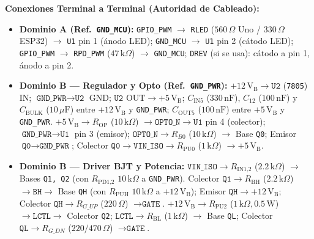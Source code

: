 \documentclass[10pt, a4paper, landscape]{article}
\begin{document}
\noindent
\begin{minipage}[t]{0.48\linewidth}
\sloppy
\textbf{Conexiones Terminal a Terminal (Autoridad de Cableado):}
\begin{itemize}[noitemsep, topsep=2pt]
    \item \textbf{Dominio A (Ref.\ \texttt{GND\_MCU}):} \texttt{GPIO\_PWM} $\rightarrow$ \texttt{RLED} ($560\,\Omega$ Uno / $330\,\Omega$ ESP32) $\rightarrow$ \texttt{U1} pin 1 (ánodo LED); \texttt{GND\_MCU} $\rightarrow$ \texttt{U1} pin 2 (cátodo LED); \texttt{GPIO\_PWM} $\rightarrow$ \texttt{RPD\_PWM} ($47\,\text{k}\Omega$) $\rightarrow$ \texttt{GND\_MCU}; \texttt{DREV} (si se usa): cátodo a pin 1, ánodo a pin 2.
    \item \textbf{Dominio B — Regulador y Opto (Ref.\ \texttt{GND\_PWR}):} $+12\,\text{V}_{\text{B}} \rightarrow \texttt{U2}$ (\texttt{7805}) IN; $\texttt{GND\_PWR} \rightarrow \texttt{U2}$ GND; $\texttt{U2}\text{ OUT} \rightarrow +5\,\text{V}_{\text{B}}$; $C_{\text{IN5}}$ ($330\,\text{nF}$), $C_{12}$ ($100\,\text{nF}$) y $C_{\text{BULK}}$ ($10\,\mu\text{F}$) entre $+12\,\text{V}_{\text{B}}$ y \texttt{GND\_PWR}; $C_{\text{OUT5}}$ ($100\,\text{nF}$) entre $+5\,\text{V}_{\text{B}}$ y \texttt{GND\_PWR}. $+5\,\text{V}_{\text{B}} \rightarrow R_{\text{OP}}$ ($10\,\text{k}\Omega$) $\rightarrow \texttt{OPTO\_N} \rightarrow \texttt{U1}$ pin 4 (colector); $\texttt{GND\_PWR} \rightarrow \texttt{U1}$ pin 3 (emisor); $\texttt{OPTO\_N} \rightarrow R_{B0}$ ($10\,\text{k}\Omega$) $\rightarrow$ Base \texttt{Q0}; Emisor $\texttt{Q0} \rightarrow \texttt{GND\_PWR}$; Colector $\texttt{Q0} \rightarrow \texttt{VIN\_ISO} \rightarrow R_{\text{PU0}}$ ($1\,\text{k}\Omega$) $\rightarrow +5\,\text{V}_{\text{B}}$.
    \item \textbf{Dominio B — Driver BJT y Potencia:} $\texttt{VIN\_ISO} \rightarrow R_{\text{IN1,2}}$ ($2.2\,\text{k}\Omega$) $\rightarrow$ Bases \texttt{Q1, Q2} (con $R_{\text{PD1,2}}$ $10\,\text{k}\Omega$ a \texttt{GND\_PWR}). Colector $\texttt{Q1} \rightarrow R_{\text{BH}}$ ($2.2\,\text{k}\Omega$) $\rightarrow \texttt{BH} \rightarrow$ Base \texttt{QH} (con $R_{\text{PUH}}$ $10\,\text{k}\Omega$ a $+12\,\text{V}_{\text{B}}$); Emisor $\texttt{QH} \rightarrow +12\,\text{V}_{\text{B}}$; Colector $\texttt{QH} \rightarrow R_{G\_UP}$ ($220\,\Omega$) $\rightarrow \texttt{GATE}$. $+12\,\text{V}_{\text{B}} \rightarrow R_{\text{PU2}}$ ($1\,\text{k}\Omega, 0.5\,\text{W}$) $\rightarrow \texttt{LCTL} \rightarrow$ Colector \texttt{Q2}; $\texttt{LCTL} \rightarrow R_{\text{BL}}$ ($1\,\text{k}\Omega$) $\rightarrow$ Base \texttt{QL}; Colector $\texttt{QL} \rightarrow R_{G\_DN}$ ($220/470\,\Omega$) $\rightarrow \texttt{GATE}$.
\end{itemize}
\end{minipage}\hfill
\end{document}
